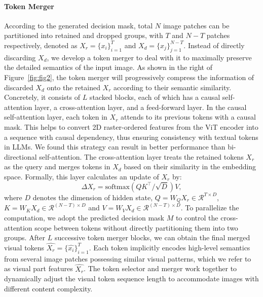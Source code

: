 \paragraph{Token Merger} According to the generated decision mask, total $N$ image patches can be partitioned into retained and dropped groups, with $T$ and $N-T$ patches respectively, denoted as $X_{r}=\{x_i\}_{i=1}^{T}$ and $X_{d}=\{x_j\}_{j=1}^{N-T}$. Instead of directly discarding $X_{d}$, we develop a token merger to deal with it to maximally preserve the detailed semantics of the input image. As shown in the right of Figure~\ref{fig:fig2}, the token merger will progressively compress the information of discarded $X_{d}$ onto the retained $X_{r}$ according to their semantic similarity. Concretely, it consists of $L$ stacked blocks, each of which has a causal self-attention layer, a cross-attention layer, and a feed-forward layer. In the causal self-attention layer, each token in $X_{r}$ attends to its previous tokens with a causal mask. This helps to convert 2D raster-ordered features from the ViT encoder into a sequence with causal dependency, thus ensuring consistency with textual tokens in LLMs. We found this strategy can result in better performance than bi-directional self-attention. The cross-attention layer treats the retained tokens $X_{r}$ as the query and merges tokens in $X_{d}$ based on their similarity in the embedding space. Formally, this layer calculates an update of $X_r$ by:
\begin{equation}
    \Delta X_r = \text{softmax}\left({QK^\top}/{\sqrt{D}}\right)V,
\end{equation}
where $D$ denotes the dimension of hidden state, $Q=W_{Q}X_r \in \mathcal{R}^{T \times D}$, $K=W_{K}X_{d} \in \mathcal{R}^{(N-T) \times D}$ and $V=W_{V}X_{d} \in \mathcal{R}^{(N-T) \times D}$. To parallelize the computation, we adopt the predicted decision mask $M$ to control the cross-attention scope between tokens without directly partitioning them into two groups. After $L$ successive token merger blocks, we can obtain the final merged visual tokens $\hat{X_r}=\{ \hat{x_i} \}_{i=1}^{T}$. Each token implicitly encodes high-level semantics from several image patches possessing similar visual patterns, which we refer to as visual part features $\hat{X_r}$. 
The token selector and merger work together to dynamically adjust the visual token sequence length to accommodate images with different content complexity.

\vspace{-0.1in}

